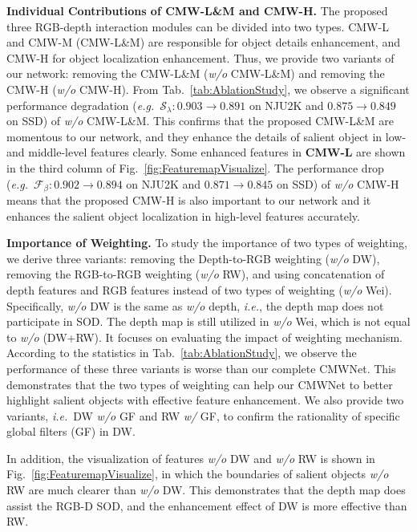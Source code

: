 \documentclass[runningheads]{llncs}
\newcommand{\eg}{\emph{e.g.}}
\newcommand{\ie}{\emph{i.e.}}
\begin{document}
\noindent\textbf{Individual Contributions of CMW-L\&M and CMW-H.}
The proposed three RGB-depth interaction modules can be divided into two types.
CMW-L and CMW-M (CMW-L\&M) are responsible for object details enhancement, and
CMW-H for object localization enhancement.
Thus, we provide two variants of our network:
removing the CMW-L\&M (\textit{w/o} CMW-L\&M) and
removing the CMW-H (\textit{w/o} CMW-H).
From Tab.~\ref{tab:AblationStudy}, we observe a significant performance degradation
(\eg~$\mathcal{S}_{\lambda}\!: 0.903\!\rightarrow\!0.891$ on NJU2K and
$0.875\!\rightarrow\!0.849$ on SSD) of \textit{w/o} CMW-L\&M.
This confirms that the proposed CMW-L\&M are momentous to our network, and they enhance
the details of salient object in low- and middle-level features clearly.
Some enhanced features in \textbf{CMW-L} are shown in the third column of
Fig.~\ref{fig:FeaturemapVisualize}.
The performance drop (\eg~$\mathcal{F}_{\beta}\!: 0.902\!\rightarrow\!0.894$ on NJU2K
and $0.871\!\rightarrow\!0.845$ on SSD)
of \textit{w/o} CMW-H means that the proposed CMW-H is also important to our network
and it enhances the salient object localization in high-level features accurately.



\noindent\textbf{Importance of Weighting.}
To study the importance of two types of weighting, we derive three variants:
removing the Depth-to-RGB weighting (\textit{w/o} DW),
removing the RGB-to-RGB weighting (\textit{w/o} RW),
and using concatenation of depth features and RGB features instead of
two types of weighting (\textit{w/o} Wei).
Specifically, \textit{w/o} DW is the same as \textit{w/o} depth, \ie,
the depth map does not participate in SOD.
The depth map is still utilized in \textit{w/o} Wei, which is not equal to \textit{w/o} (DW+RW).
It focuses on evaluating the impact of weighting mechanism.
According to the statistics in Tab.~\ref{tab:AblationStudy},
we observe the performance of these three variants is
worse than our complete CMWNet.
This demonstrates that the two types of weighting can help our CMWNet to
better highlight salient objects with effective feature enhancement.
We also provide two variants, \ie~DW \textit{w/o} GF and RW \textit{w/} GF,
to confirm the rationality of specific global filters (GF) in DW.


In addition, the visualization of features \textit{w/o} DW and
\textit{w/o} RW is shown in Fig.~\ref{fig:FeaturemapVisualize},
in which the boundaries of salient objects \textit{w/o} RW are
much clearer than \textit{w/o} DW.
This demonstrates that the depth map does assist the RGB-D SOD,
and the enhancement effect of DW is more effective than RW.
\end{document}
